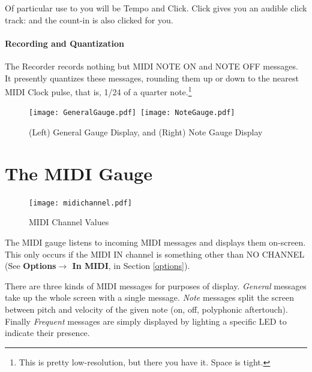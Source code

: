 \documentclass{article}
\begin{document}
\vspace{1em}
Of particular use to you will be Tempo and Click.  Click gives you an audible click track: and the count-in is also clicked for you.

\paragraph{Recording and Quantization}

The Recorder records nothing but MIDI NOTE ON and NOTE OFF messages.  It presently quantizes these messages, rounding them up or down to the nearest MIDI Clock pulse, that is, 1/24 of a quarter note.\footnote{This is pretty low-resolution, but there you have it.  Space is tight.}


\clearpage

\vspace{2em}
\begin{figure}[h!]
\begin{center}
\texttt{[image: GeneralGauge.pdf]}~\texttt{[image: NoteGauge.pdf]}
\caption{\small (Left) General Gauge Display, and (Right) Note Gauge Display}
\label{gaugedisplays} \end{center}
\vspace{-3em}\end{figure}


\section {The MIDI Gauge}


\begin{figure}
\vspace{-1.5em}\texttt{[image: midichannel.pdf]}
\vspace{-2em}\caption{\small MIDI Channel Values}
\label{midichannelvalues}
\end{figure}


The MIDI gauge listens to incoming MIDI messages and displays them on-screen.  This only occurs if the MIDI IN channel is something other than NO CHANNEL (See {\bf Options\(\boldsymbol\rightarrow\) In MIDI}, in Section \ref{options}).



There are three kinds of MIDI messages for purposes of display.  {\it General} messages take up the whole screen with a single message.  {\it Note} messages split the screen between pitch and velocity of the given note (on, off, polyphonic aftertouch).  Finally {\it Frequent} messages are simply displayed by lighting a specific LED to indicate their presence. 
\end{document}
